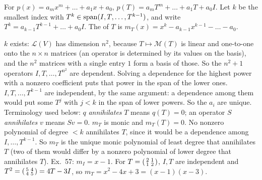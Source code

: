 \documentclass[10pt]{scrartcl}
\newcommand{\LL}{\mathcal L}\newcommand{\PP}{\mathcal P}\newcommand{\MM}{\mathcal M}
\begin{document}
\begin{definition*}\hypertarget{def-35}{}\label{def-35}
  For $p(x)=a_mx^m+\dots+a_1x+a_0$, $p(T)=a_mT^m+\dots+a_1T+a_0I$. Let $k$ be the smallest index with $T^k\in\operatorname{span}(I,T,\dots,T^{k-1})$, and write $T^k=a_{k-1}T^{k-1}+\dots+a_0I$. The  of $T$ is $m_T(x)=x^k-a_{k-1}x^{k-1}-\dots-a_0$.
\end{definition*}
\begin{itemize}
  \ii $k$ exists: $\LL(V)$ has dimension $n^2$, because $T\mapsto\MM(T)$ is linear and one-to-one onto the $n\times n$ matrices (an operator is determined by its values on the basis), and the $n^2$ matrices with a single entry $1$ form a basis of those. So the $n^2+1$ operators $I,T,\dots,T^{n^2}$ are dependent. Solving a dependence for the highest power with a nonzero coefficient puts that power in the span of the lower ones.
  \ii $I,T,\dots,T^{k-1}$ are independent, by the same argument: a dependence among them would put some $T^j$ with $j<k$ in the span of lower powers. So the $a_i$ are unique.
  \ii Terminology used below: $q$ \emph{annihilates} $T$ means $q(T)=0$; an operator $S$ \emph{annihilates} $v$ means $Sv=0$.
  \ii $m_T$ is monic and $m_T(T)=0$. No nonzero polynomial of degree $<k$ annihilates $T$, since it would be a dependence among $I,\dots,T^{k-1}$. So $m_T$ is the unique monic polynomial of least degree that annihilates $T$ (two of them would differ by a nonzero polynomial of lower degree that annihilates $T$).
  \ii Ex.~57: $m_I=x-1$. For $T=\begin{psmallmatrix}2&1\\1&2\end{psmallmatrix}$, $I,T$ are independent and $T^2=\begin{psmallmatrix}5&4\\4&5\end{psmallmatrix}=4T-3I$, so $m_T=x^2-4x+3=(x-1)(x-3)$.
\end{itemize}
\end{document}
